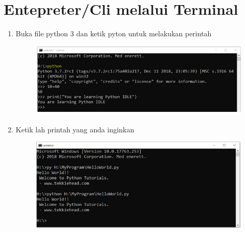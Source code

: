 \section{Entepreter/Cli melalui Terminal}
\begin{enumerate}
    \item Buka file python 3 dan ketik pyton untuk melakukan perintah

\begin{figure}[!htbp]
    \centering
    \includegraphics[scale=0.5]{figures/11.png}
    \label{visimisi}
\end{figure}

    \item Ketik lah printah yang anda inginkan

\begin{figure}[!htbp]
    \centering
    \includegraphics[scale=0.5]{figures/12.png}
    \label{visimisi}
\end{figure}

\end{enumerate}

